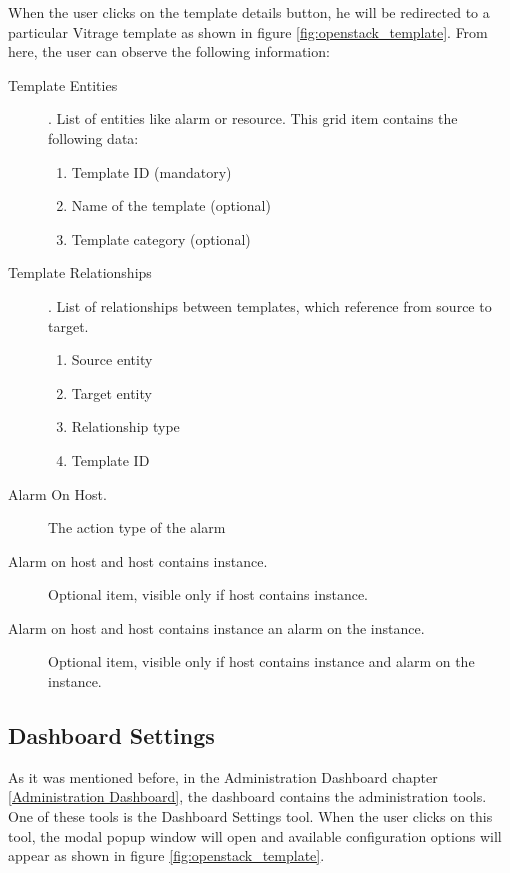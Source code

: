 When the user clicks on the template details button, he will be redirected to a particular Vitrage template as shown in figure \ref{fig:openstack_template}. From here, the user can observe the following information:
\begin{description}
\item[Template Entities]. List of entities like alarm or resource. This grid item contains the following data:
\begin{enumerate}
\item Template ID (mandatory)
\item Name of the template (optional)
\item Template category (optional)
\end{enumerate}
\item[Template Relationships]. List of relationships between templates, which reference from source to target.
\begin{enumerate}
\item Source entity
\item Target entity
\item Relationship type
\item Template ID
\end{enumerate}
\item[Alarm On Host.] The action type of the alarm
\item[Alarm on host and host contains instance.] Optional item, visible only if host contains instance.
\item[Alarm on host and host contains instance an alarm on the instance.] Optional item, visible only if host contains instance and alarm on the instance.

\end{description}





\subsection{Dashboard Settings}\label{Dashboard Settings}
As it was mentioned before, in the Administration Dashboard chapter \autoref{Administration Dashboard}, the dashboard contains the administration tools. One of these tools is the Dashboard Settings tool. When the user clicks on this tool, the modal popup window will open and available configuration options will appear as shown in figure \ref{fig:openstack_template}.


